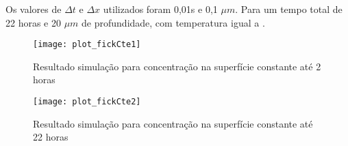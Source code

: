 Os valores de $\Delta t$ e $\Delta x$ utilizados foram 0,01s e 0,1 $\mu m$. Para um tempo total de 22 horas e 20 $\mu m$ de profundidade, com temperatura igual a .



\begin{figure}[ht]
\centering
	\caption{Resultado simulação para concentração na superfície constante até 2 horas}
	\texttt{[image: plot\_fickCte1]}
	\label{fig:csvar-gas}
	\centering
\end{figure}


\begin{figure}[ht]
\centering
	\caption{Resultado simulação para concentração na superfície constante até 22 horas}
	\texttt{[image: plot\_fickCte2]}
	\label{fig:csvar-gas}
	\centering
\end{figure}




